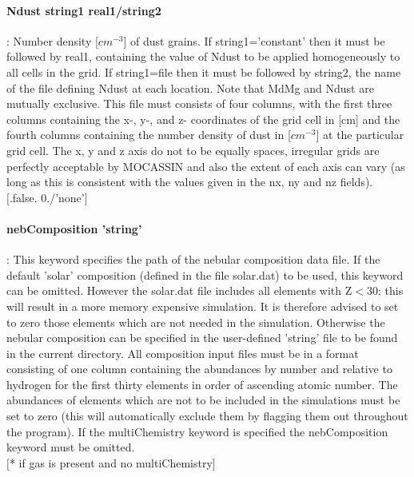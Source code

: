 \documentclass[11pt]{article}
\begin{document}
\paragraph    {Ndust string1 real1/string2 }: Number density [$cm^{-3}$] of dust grains. If 
                     string1='constant' then it must be followed by real1, containing 
                     the value of Ndust to be applied homogeneously to all cells in the 
                     grid. If string1=file then it must be followed by string2, the name of 
                     the file defining Ndust at each location. Note that MdMg and Ndust are 
		     mutually exclusive. This file must consists of four columns, with the first three 
		     columns containing the x-, y-, and z- coordinates of the grid cell in 
		     [cm] and the fourth columns containing the number density of dust
                     in [$cm^{-3}$] at the particular grid cell. The 
		     x, y and z axis do not to be equally spaces, irregular grids are 
		     perfectly acceptable by MOCASSIN and also the extent of each axis 
		     can vary (as long as this is consistent with the values given in 
		     the nx, ny and nz fields).\\
		     $[$.false. 0./'none'$]$\\

\paragraph   { nebComposition 'string'}: This keyword specifies the path of the nebular 
		     composition data file. If the default 'solar' composition 
		     (defined in the file solar.dat) to be used, this keyword can 
		     be omitted. However the solar.dat file includes all elements 
		     with Z$<$30: this will result in a more memory expensive 
		     simulation. It is therefore advised to set to zero those 
		     elements which are not needed in the simulation. Otherwise the 
		     nebular composition can be specified in the user-defined 'string' 
		     file to be found in the current directory. All composition 
		     input files must be in a format consisting of one column containing 
		     the abundances by number and relative to hydrogen for the first 
		     thirty elements in order of ascending atomic number.
		     The abundances of elements which are not to be included in 
		     the simulations must be set to zero (this will automatically
		     exclude them by flagging them out throughout the program).
		     If the multiChemistry keyword is specified the nebComposition 
		     keyword must be omitted.\\
		     $[$* if gas is present and no multiChemistry$]$\\
\end{document}
